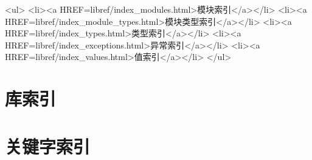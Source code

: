 \ifouthtml
\begin{rawhtml}
<ul>
<li><a HREF=libref/index_modules.html>模块索引</a></li>
<li><a HREF=libref/index_module_types.html>模块类型索引</a></li>
<li><a HREF=libref/index_types.html>类型索引</a></li>
<li><a HREF=libref/index_exceptions.html>异常索引</a></li>
<li><a HREF=libref/index_values.html>值索引</a></li>
</ul>
\end{rawhtml}
\else
\chapter*{库索引}
\fi
\chapter*{关键字索引}
